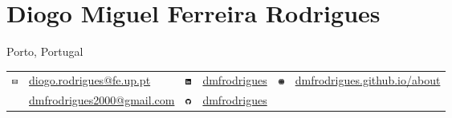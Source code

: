 \documentclass{cv}
\begin{document}
\thispagestyle{empty}
\vspace*{-3\baselineskip}
\noindent
\begin{minipage}[l]{0.85\textwidth}
    \section*{Diogo Miguel Ferreira Rodrigues}
    Porto, Portugal\\
    \begin{tabular}{@{}c @{\hskip 0.5em} l @{\hskip 8mm} c @{\hskip 0.5em} l @{\hskip 8mm} c @{\hskip 0.5em} l @{}}
        \includegraphics[height=7px]{img/email.png} & \href{mailto:diogo.rodrigues@fe.up.pt}{diogo.rodrigues@fe.up.pt}     & \includegraphics[height=7px]{img/linkedin.png} & \href{https://www.linkedin.com/in/dmfrodrigues/}{dmfrodrigues} & \includegraphics[height=7px]{img/globe.png} & \href{https://dmfrodrigues.github.io/about/}{dmfrodrigues.github.io/about} \\
                                                    & \href{mailto:dmfrodrigues2000@gmail.com}{dmfrodrigues2000@gmail.com} & \includegraphics[height=7px]{img/github.png}   & \href{https://github.com/dmfrodrigues}{dmfrodrigues}           &                                             &                                                                            \\
    \end{tabular}
\end{minipage}%
\end{document}
